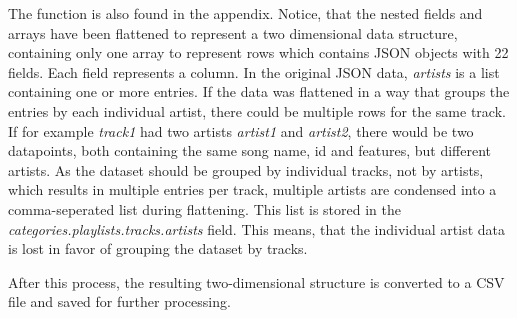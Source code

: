 The function is also found in the appendix.
Notice, that the nested fields and arrays have been flattened to represent a two dimensional data structure,
containing only one array to represent rows which contains JSON objects with 22 fields. Each field represents
a column. In the original JSON data, \emph{artists} is a list containing one or more entries.
If the data was flattened in a way that groups the entries by each individual artist,
there could be multiple rows for the same track.
If for example \emph{track1} had two artists \emph{artist1} and \emph{artist2}, there would be two datapoints,
both containing the same song name, id and features, but different artists.
As the dataset should be grouped by individual tracks, not by artists, which results in multiple
entries per track, multiple artists are condensed into a comma-seperated list during flattening.
This list is stored in the \emph{categories.playlists.tracks.artists} field.
This means, that the individual artist data is lost in favor of grouping the dataset by tracks.

After this process, the resulting two-dimensional structure is converted to a CSV file and saved for
further processing.